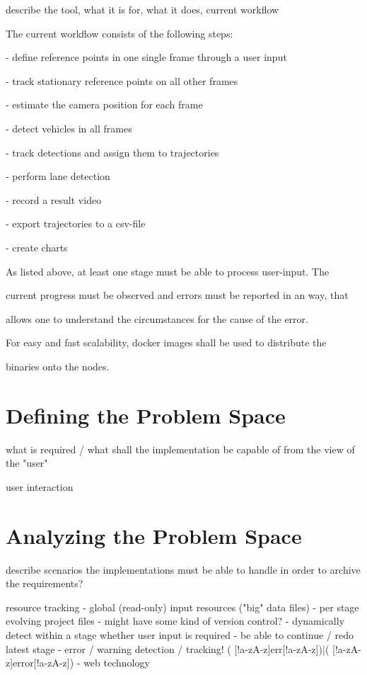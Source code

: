 describe the tool, what it is for, what it does, current workflow

The current workflow consists of the following steps:

- define reference points in one single frame through a user input

- track stationary reference points on all other frames

- estimate the camera position for each frame

- detect vehicles in all frames

- track detections and assign them to trajectories

- perform lane detection

- record a result video

- export trajectories to a csv-file

- create charts



As listed above, at least one stage must be able to process user-input. The

current progress must be observed and errors must be reported in an way, that

allows one to understand the circumstances for the cause of the error.

For easy and fast scalability, docker images shall be used to distribute the

binaries onto the nodes.


\section{Defining the Problem Space}

what is required / what shall the implementation be capable of from the view of the "user"

user interaction



\section{Analyzing the Problem Space}

describe scenarios the implementations must be able to handle in order to archive the requirements?

resource tracking
- global (read-only) input resources ("big" data files)
- per stage evolving project files
- might have some kind of version control?
- dynamically detect within a stage whether user input is required
- be able to continue / redo latest stage
- error / warning detection / tracking!
( [!a-zA-z]err[!a-zA-z])|( [!a-zA-z]error[!a-zA-z])
- web technology

